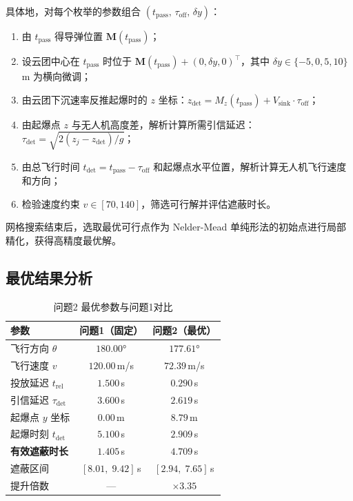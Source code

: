 \documentclass[12pt, a4paper]{article}
\begin{document}
具体地，对每个枚举的参数组合 $(t_{\mathrm{pass}},\,\tau_{\mathrm{off}},\,\delta y)$：
\begin{enumerate}[leftmargin=2.5em]
  \item 由 $t_{\mathrm{pass}}$ 得导弹位置 $\boldsymbol{M}(t_{\mathrm{pass}})$；
  \item 设云团中心在 $t_{\mathrm{pass}}$ 时位于 $\boldsymbol{M}(t_{\mathrm{pass}}) + (0,\delta y,0)^{\top}$，其中 $\delta y\in\{-5,0,5,10\}$\,m 为横向微调；
  \item 由云团下沉速率反推起爆时的 $z$ 坐标：$z_{\mathrm{det}} = M_z(t_{\mathrm{pass}}) + V_{\mathrm{sink}}\cdot\tau_{\mathrm{off}}$；
  \item 由起爆点 $z$ 与无人机高度差，解析计算所需引信延迟：$\tau_{\mathrm{det}} = \sqrt{2(z_j - z_{\mathrm{det}})/g}$；
  \item 由总飞行时间 $t_{\mathrm{det}} = t_{\mathrm{pass}} - \tau_{\mathrm{off}}$ 和起爆点水平位置，解析计算无人机飞行速度和方向；
  \item 检验速度约束 $v\in[70,140]$，筛选可行解并评估遮蔽时长。
\end{enumerate}

网格搜索结束后，选取最优可行点作为 Nelder-Mead 单纯形法的初始点进行局部精化，获得高精度最优解。

\subsection{最优结果分析}

\begin{table}[H]
\centering
\caption{问题2 最优参数与问题1对比}
\begin{tabular}{lcc}
\toprule
参数 & 问题1（固定） & 问题2（最优） \\
\midrule
飞行方向 $\theta$ & $180.00°$ & $177.61°$ \\
飞行速度 $v$ & $120.00$\,m/s & $72.39$\,m/s \\
投放延迟 $t_{\mathrm{rel}}$ & $1.500$\,s & $0.290$\,s \\
引信延迟 $\tau_{\mathrm{det}}$ & $3.600$\,s & $2.619$\,s \\
起爆点 $y$ 坐标 & $0.00$\,m & $8.79$\,m \\
起爆时刻 $t_{\mathrm{det}}$ & $5.100$\,s & $2.909$\,s \\
\midrule
\textbf{有效遮蔽时长} & $1.405$\,s & $\mathbf{4.709}$\,s \\
遮蔽区间 & $[8.01,\;9.42]$\,s & $[2.94,\;7.65]$\,s \\
提升倍数 & — & $\times 3.35$ \\
\bottomrule
\end{tabular}
\end{table}
\end{document}
